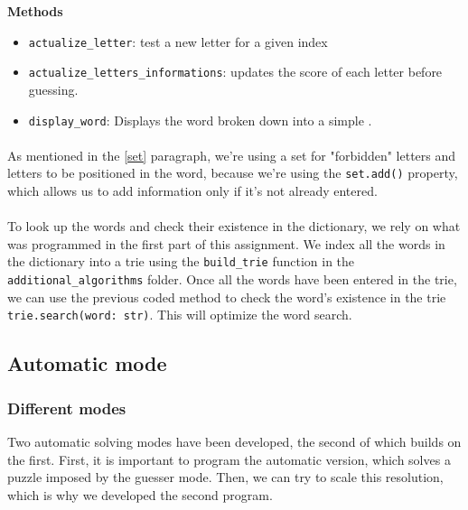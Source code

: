 \documentclass[10pt,a4paper,hidelinks]{article}
\begin{document}
\textbf{Methods}
\begin{itemize}
    \setcounter{enumi}{-1}
    \item \verb|actualize_letter|: test a new letter for a given index
    \item \verb|actualize_letters_informations|: updates the score of each letter before guessing.
    \item \verb|display_word|: Displays the word broken down into a simple .
\end{itemize}

\paragraph{}
As mentioned in the \ref{set} paragraph, we're using a set for "forbidden" letters and letters to be positioned in the word, because we're using the \verb|set.add()| property, which allows us to add information only if it's not already entered.

\paragraph{}
To look up the words and check their existence in the dictionary, we rely on what was programmed in the first part of this assignment. We index all the words in the dictionary into a trie using the \verb|build_trie| function in the \verb|additional_algorithms| folder. Once all the words have been entered in the trie, we can use the previous coded method to check the word's existence in the trie \verb|trie.search(word: str)|.
This will optimize the word search.


\subsection{Automatic mode}
\subsubsection{Different modes}
Two automatic solving modes have been developed, the second of which builds on the first. First, it is important to program the automatic version, which solves a puzzle imposed by the guesser mode. Then, we can try to scale this resolution, which is why we developed the second program.
\end{document}
